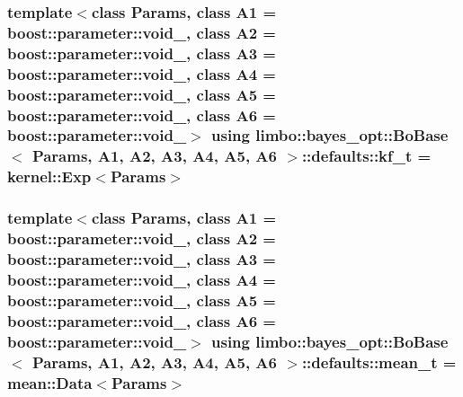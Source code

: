 \subsubsection[{\texorpdfstring{kf\+\_\+t}{kf_t}}]{\setlength{\rightskip}{0pt plus 5cm}template$<$class Params, class A1 = boost\+::parameter\+::void\+\_\+, class A2 = boost\+::parameter\+::void\+\_\+, class A3 = boost\+::parameter\+::void\+\_\+, class A4 = boost\+::parameter\+::void\+\_\+, class A5 = boost\+::parameter\+::void\+\_\+, class A6 = boost\+::parameter\+::void\+\_\+$>$ using {\bf limbo\+::bayes\+\_\+opt\+::\+Bo\+Base}$<$ Params, A1, A2, A3, A4, A5, A6 $>$\+::{\bf defaults\+::kf\+\_\+t} =  {\bf kernel\+::\+Exp}$<$Params$>$}\hypertarget{structlimbo_1_1bayes__opt_1_1_bo_base_1_1defaults_a74f559358b99209461a1aac1e0dacb1f}{}\label{structlimbo_1_1bayes__opt_1_1_bo_base_1_1defaults_a74f559358b99209461a1aac1e0dacb1f}
\subsubsection[{\texorpdfstring{mean\+\_\+t}{mean_t}}]{\setlength{\rightskip}{0pt plus 5cm}template$<$class Params, class A1 = boost\+::parameter\+::void\+\_\+, class A2 = boost\+::parameter\+::void\+\_\+, class A3 = boost\+::parameter\+::void\+\_\+, class A4 = boost\+::parameter\+::void\+\_\+, class A5 = boost\+::parameter\+::void\+\_\+, class A6 = boost\+::parameter\+::void\+\_\+$>$ using {\bf limbo\+::bayes\+\_\+opt\+::\+Bo\+Base}$<$ Params, A1, A2, A3, A4, A5, A6 $>$\+::{\bf defaults\+::mean\+\_\+t} =  {\bf mean\+::\+Data}$<$Params$>$}\hypertarget{structlimbo_1_1bayes__opt_1_1_bo_base_1_1defaults_ae8b922abc8e126f785e1001342cf47ae}{}\label{structlimbo_1_1bayes__opt_1_1_bo_base_1_1defaults_ae8b922abc8e126f785e1001342cf47ae}

